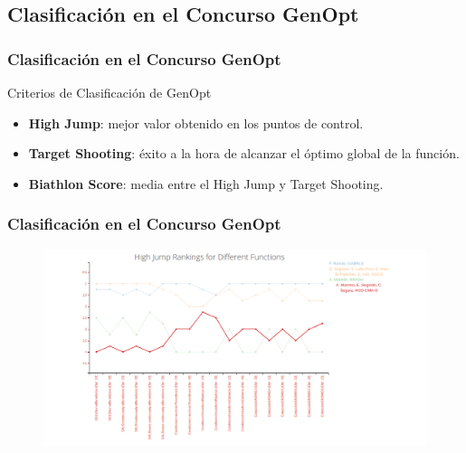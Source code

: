 \subsection{Clasificación en el Concurso GenOpt}
\begin{frame}
\frametitle{Clasificación en el Concurso GenOpt}
\begin{block}{Criterios de Clasificación de GenOpt}
\begin{itemize}
    	  	\item \textbf{High Jump}: mejor valor obtenido en los puntos de control.
    	  	\item \textbf{Target Shooting}: éxito a la hora de alcanzar el óptimo global de la función.
    	  	\item \textbf{Biathlon Score}: media entre el High Jump y Target Shooting.
\end{itemize}
\end{block}
\end{frame}

\begin{frame}
\frametitle{Clasificación en el Concurso GenOpt}
\begin{figure}[!ht]
  \centering
  \includegraphics[scale=0.3]{img/highjump}
\end{figure}
\end{frame}
